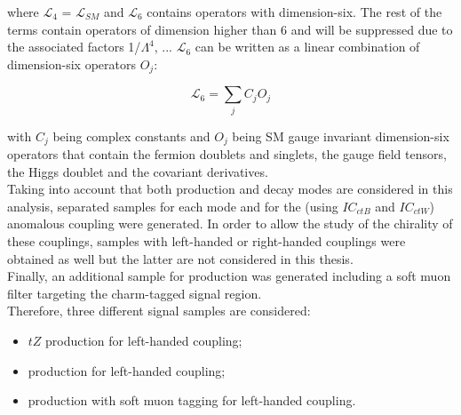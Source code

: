 \noindent where $\mathcal{L}_4$ = $\mathcal{L}_{SM}$ and $\mathcal{L}_6$ contains operators with dimension-six. The rest of the terms contain operators of dimension higher than 6 and will be suppressed due to the associated factors 1/$\Lambda^4$, ... $\mathcal{L}_6$ can be written as a linear combination of dimension-six operators $O_j$: 

\begin{equation}
\mathcal{L}_6 = \sum_j C_j O_j
\end{equation}

\noindent with $C_j$ being complex constants and $O_j$ being SM gauge invariant dimension-six operators that contain the fermion doublets and singlets, the gauge field tensors, the Higgs doublet and the covariant derivatives.\\
Taking into account that both production and decay modes are considered in this analysis, separated samples for each mode and for the \tZc (using $IC_{ctB}$ and $IC_{ctW}$) anomalous coupling were generated. In order to allow the study of the chirality of these couplings, samples with left-handed or right-handed couplings were obtained as well but the latter are not considered in this thesis.\\ Finally, an additional sample for \ttbar production was generated including a soft muon filter targeting the charm-tagged signal region. \\
Therefore, three different signal samples are considered:
\begin{itemize}
	\item $tZ$ production for \tZc left-handed coupling; 
	\item \ttbar production for \tZc left-handed coupling; 
	\item \ttbar production with soft muon tagging for \tZc left-handed coupling. 
\end{itemize}

